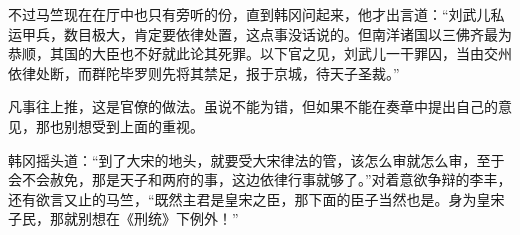 不过马竺现在在厅中也只有旁听的份，直到韩冈问起来，他才出言道：“刘武儿私运甲兵，数目极大，肯定要依律处置，这点事没话说的。但南洋诸国以三佛齐最为恭顺，其国的大臣也不好就此论其死罪。以下官之见，刘武儿一干罪囚，当由交州依律处断，而群陀毕罗则先将其禁足，报于京城，待天子圣裁。”

凡事往上推，这是官僚的做法。虽说不能为错，但如果不能在奏章中提出自己的意见，那也别想受到上面的重视。

韩冈摇头道：“到了大宋的地头，就要受大宋律法的管，该怎么审就怎么审，至于会不会赦免，那是天子和两府的事，这边依律行事就够了。”对着意欲争辩的李丰，还有欲言又止的马竺，“既然主君是皇宋之臣，那下面的臣子当然也是。身为皇宋子民，那就别想在《刑统》下例外！”

